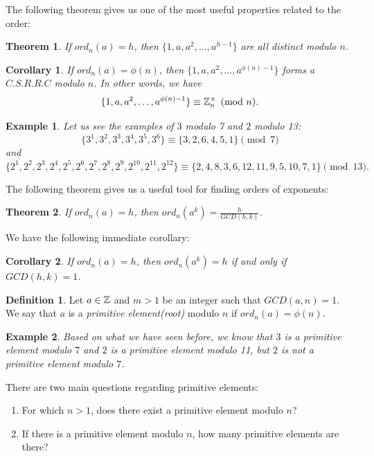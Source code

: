 \documentclass[12pt]{article}
\theoremstyle{plain}
\newtheorem{corollary}{Corollary}
\newtheorem{example}{Example}
\newtheorem{theorem}{Theorem}
\theoremstyle{definition}
\newtheorem{definition}{Definition}
\theoremstyle{remark}
\begin{document}
\bigskip
\noindent

The following theorem gives us one of the most useful properties related to the order:
\begin{theorem}
If $ord_n(a)=h$, then $\{1,a,a^2, \dots, a^{h-1}\}$ are all distinct modulo $n$.
\end{theorem}

\begin{corollary}
If $ord_n(a)=\phi(n)$, then $\{1,a, a^2, \dots, a^{\phi(n)-1}\}$ forms a $C.S.R.R.C$ modulo $n$. In other words, we have 
$$\{1,a, a^2, \dots, a^{\phi(n)-1}\} \equiv \mathbb{Z}_n^{\times} \pmod{n}.$$
\end{corollary}
\begin{example}
Let us see the examples of $3$ modulo 7 and $2$ modulo 13:
$$\{3^1, 3^2, 3^3, 3^4, 3^5, 3^6\} \equiv \{3, 2, 6, 4, 5, 1\} \pmod{7}$$ and
$$\{2^1, 2^2, 2^3, 2^4, 2^5, 2^6, 2^7, 2^8, 2^9, 2^{10}, 2^{11}, 2^{12}\} \equiv \{2, 4, 8, 3, 6, 12, 11, 9, 5, 10, 7, 1\} \pmod{13}.$$
\end{example}

\bigskip
\noindent
The following theorem gives us a useful tool for finding orders of exponents:
\begin{theorem}
If $ord_n(a)=h$, then $ord_n(a^k) = \frac{h}{GCD(h,k)}$.
\end{theorem}

\bigskip
\noindent
We have the following immediate corollary:
\begin{corollary}
If $ord_{n}(a)=h$, then $ord_n(a^k)=h$ if and only if $GCD(h,k)=1$. 
\end{corollary}

\bigskip
\noindent
\begin{definition}
Let $a\in \mathbb{Z}$ and $m>1$ be an integer such that $GCD(a,n)=1$. We say that $a$ is a {\it primitive element(root)} modulo $n$ if $ord_n(a)=\phi(n)$.
\end{definition}

\begin{example}
Based on what we have seen before, we know that $3$ is a primitive element modulo $7$ and $2$ is a primitive element modulo 11, but $2$ is not a primitive element modulo $7$.
\end{example}

\bigskip
\noindent
There are two main questions regarding primitive elements:
\begin{enumerate}
    \item For which $n>1$, does there exist a primitive element modulo $n$?
    \item If there is a primitive element modulo $n$, how many primitive elements are there?
\end{enumerate}
\end{document}
